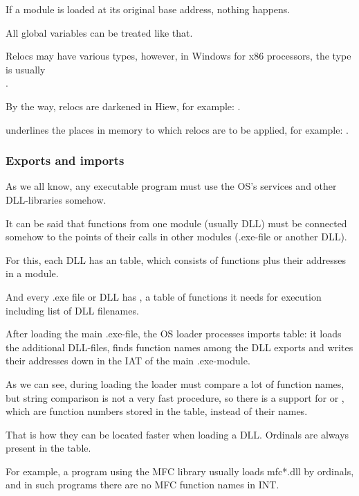 If a module is loaded at its original base address, nothing happens.

All global variables can be treated like that.

Relocs may have various types, however, in Windows for x86 processors, the type is usually \\
.


By the way, relocs are darkened in Hiew, for example: .

\myindex{\olly}
\olly underlines the places in memory to which relocs are to be applied, for example: .

\subsubsection{Exports and imports}

\label{PE_exports_imports}
As we all know, any executable program must use the \ac{OS}'s services and other DLL-libraries somehow.

It can be said that functions from one module (usually DLL) must be connected somehow to the points of their
calls in other modules (.exe-file or another DLL).

For this, each DLL has an  table, which consists of functions plus their addresses in a module.

And every .exe file or DLL has , a table of functions it needs for execution including
list of DLL filenames.

After loading the main .exe-file, the \ac{OS} loader processes imports table: 
it loads the additional DLL-files, finds function names
among the DLL exports and writes their addresses down in the \ac{IAT} of the main .exe-module.


As we can see, during loading the loader must compare a lot of function names, but string comparison is not a very
fast procedure, so there is a support for  or ,
which are function numbers stored in the table, instead of their names.

That is how they can be located faster when loading a DLL.
Ordinals are always present in the  table.

For example, a program using the \ac{MFC} library usually loads mfc*.dll by ordinals,
and in such programs there are no \ac{MFC} function names in \ac{INT}.

